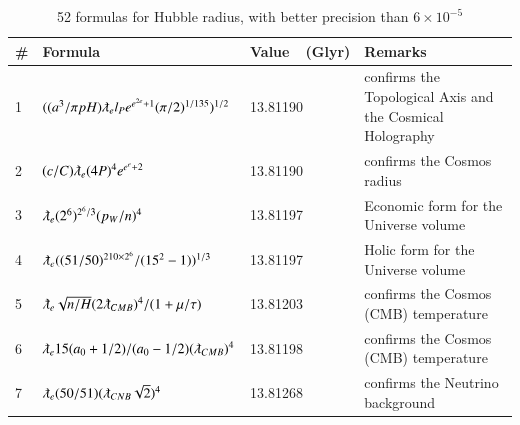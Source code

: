 \documentclass[a4paper,9pt]{article}
\begin{document}
\begin{appendix}
\begin{table}
\begin{tabular}{llll}
    
    
    
    
     
    \bottomrule
  \end{tabular}
\end{table}



\begin{table}
\caption{52 formulas for Hubble radius, with better precision than $6 \times 10^{-5}$}
\label{tab:6:table6}
  \hskip-2.0cm\begin{tabular}{llll}
    \toprule
    \cmidrule(r){1-4}
   \#     & Formula     & Value~~(Glyr) & Remarks \\
    \midrule    
    
     1 & $ ((a^3/\pi pH) \lambdabar_{e} l_P e^{e^{2e}+1} (\pi/2)^{1/135})^{1/2} $ & 13.81190 & confirms the Topological Axis and the Cosmical Holography  \\  
    2 & $ (c/C) \lambdabar_{e} (4P)^4 e^{e^{e}+2}  $ & 13.81190 & confirms the Cosmos radius  \\
    3 & $ \lambdabar_{e} (2^6)^{2^6/3} (p_W/n)^4  $ & 13.81197 & Economic form for the Universe volume \\    
    4 & $ \lambdabar_{e} ((51/50)^{210\times 2^6}/(15^2-1))^{1/3}  $ & 13.81197 & Holic form for the Universe volume \\    
    5 & $ \lambdabar_{e} \sqrt{n/H} (2\lambdabar_{CMB})^4 / (1+\mu/\tau) $ & 13.81203 & confirms the Cosmos (CMB) temperature \\   
    6 & $ \lambdabar_{e} 15(a_0+1/2)/(a_0-1/2) (\lambdabar_{CMB})^4  $ & 13.81198 & confirms the Cosmos (CMB) temperature \\    
    7 & $ \lambdabar_{e} (50/51) (\lambdabar_{CNB} \sqrt2)^4  $ & 13.81268 & confirms the Neutrino background \\   
    

\end{tabular}
\end{table}
\end{appendix}
\end{document}
